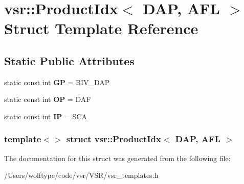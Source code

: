 \hypertarget{structvsr_1_1_product_idx_3_01_d_a_p_00_01_a_f_l_01_4}{\section{vsr\-:\-:Product\-Idx$<$ D\-A\-P, A\-F\-L $>$ Struct Template Reference}
\label{structvsr_1_1_product_idx_3_01_d_a_p_00_01_a_f_l_01_4}
}
\subsection*{Static Public Attributes}
\begin{DoxyCompactItemize}
\item 
\hypertarget{structvsr_1_1_product_idx_3_01_d_a_p_00_01_a_f_l_01_4_a7740b4da43c8d2e64c7ab1f048bca639}{static const int {\bfseries G\-P} = B\-I\-V\-\_\-\-D\-A\-P}\label{structvsr_1_1_product_idx_3_01_d_a_p_00_01_a_f_l_01_4_a7740b4da43c8d2e64c7ab1f048bca639}

\item 
\hypertarget{structvsr_1_1_product_idx_3_01_d_a_p_00_01_a_f_l_01_4_a6255d38abd693cba871a6b8c07de21cb}{static const int {\bfseries O\-P} = D\-A\-F}\label{structvsr_1_1_product_idx_3_01_d_a_p_00_01_a_f_l_01_4_a6255d38abd693cba871a6b8c07de21cb}

\item 
\hypertarget{structvsr_1_1_product_idx_3_01_d_a_p_00_01_a_f_l_01_4_ae7014e73ec398b78f5c20f06eb4e55b2}{static const int {\bfseries I\-P} = S\-C\-A}\label{structvsr_1_1_product_idx_3_01_d_a_p_00_01_a_f_l_01_4_ae7014e73ec398b78f5c20f06eb4e55b2}

\end{DoxyCompactItemize}
\subsubsection*{template$<$$>$ struct vsr\-::\-Product\-Idx$<$ D\-A\-P, A\-F\-L $>$}



The documentation for this struct was generated from the following file\-:\begin{DoxyCompactItemize}
\item 
/\-Users/wolftype/code/vsr/\-V\-S\-R/vsr\-\_\-templates.\-h\end{DoxyCompactItemize}
